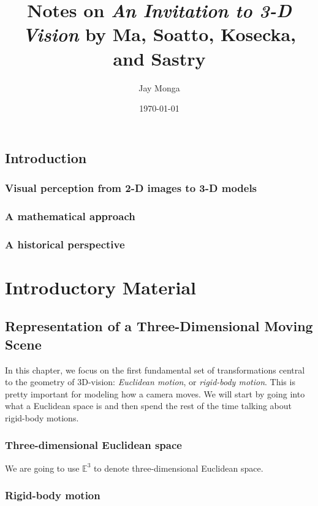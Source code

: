 \documentclass{book}
\begin{document}
\title{Notes on \textit{An Invitation to 3-D Vision} by Ma, Soatto, Kosecka, and Sastry}
\author{Jay Monga}
\date{\today}
\maketitle

\tableofcontents

\chapter{Introduction}

\section{Visual perception from 2-D images to 3-D models}

\section{A mathematical approach}

\section{A historical perspective}

\part{Introductory Material}

\chapter{Representation of a Three-Dimensional Moving Scene}

In this chapter, we focus on the first fundamental set of transformations central to the geometry of 3D-vision: \textit{Euclidean motion}, or \textit{rigid-body motion}.
This is pretty important for modeling how a camera moves.
We will start by going into what a Euclidean space is and then spend the rest of the time talking about rigid-body motions.

\section{Three-dimensional Euclidean space}
We are going to use $\mathbb{E}^3$ to denote three-dimensional Euclidean space.

\section{Rigid-body motion}
\end{document}
